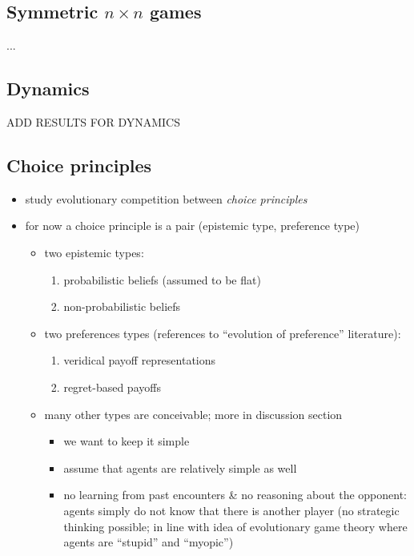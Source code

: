 \documentclass[fleqn,reqno,11pt]{article}
\begin{document}
\subsection{Symmetric $n \times n$ games}

...

\subsection{Dynamics}

ADD RESULTS FOR DYNAMICS

\subsection{Choice principles}

\begin{itemize}
\item study evolutionary competition between \emph{choice principles} 
\item for now a choice principle is a pair (epistemic type, preference type)
  \begin{itemize}
  \item two epistemic types:
    \begin{enumerate}
    \item probabilistic beliefs (assumed to be flat)
    \item non-probabilistic beliefs
    \end{enumerate}
  \item two preferences types (references to ``evolution of preference'' literature):
    \begin{enumerate}
    \item veridical payoff representations
    \item regret-based payoffs
    \end{enumerate}
  \item many other types are conceivable; more in discussion section
    \begin{itemize}
    \item we want to keep it simple
    \item assume that agents are relatively simple as well
    \item no learning from past encounters \& no reasoning about the opponent: agents simply do
      not know that there is another player (no strategic thinking possible; in line with idea
      of evolutionary game theory where agents are ``stupid'' and ``myopic'') \\

\end{itemize}
\end{itemize}
\end{itemize}
\end{document}
